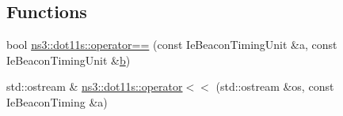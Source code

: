 \subsection*{Functions}
\begin{DoxyCompactItemize}
\item 
bool \hyperlink{namespacens3_1_1dot11s_aea4d921c21dfcbe118a0025929c97465}{ns3\+::dot11s\+::operator==} (const Ie\+Beacon\+Timing\+Unit \&a, const Ie\+Beacon\+Timing\+Unit \&\hyperlink{lte__pathloss_8m_a21ad0bd836b90d08f4cf640b4c298e7c}{b})
\item 
std\+::ostream \& \hyperlink{namespacens3_1_1dot11s_ae0278b579c45cfe5ad549d86be2f115d}{ns3\+::dot11s\+::operator$<$$<$} (std\+::ostream \&os, const Ie\+Beacon\+Timing \&a)
\end{DoxyCompactItemize}

